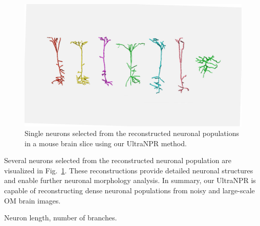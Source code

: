 \begin{figure}[t]
	\centering
	\includegraphics[width=0.8\columnwidth]{./Illustrations/single_neurons4.pdf}
	\caption{Single neurons selected from the reconstructed neuronal populations in a mouse brain slice using our UltraNPR method.}
	\label{fig:single_neurons}
\end{figure}


Several neurons selected from the reconstructed neuronal population are visualized in Fig.~\ref{fig:single_neurons}. These reconstructions provide detailed neuronal structures and enable further neuronal morphology analysis. 
In summary, our UltraNPR is capable of reconstructing dense neuronal populations from noisy and large-scale OM brain images.

Neuron length, number of branches.

